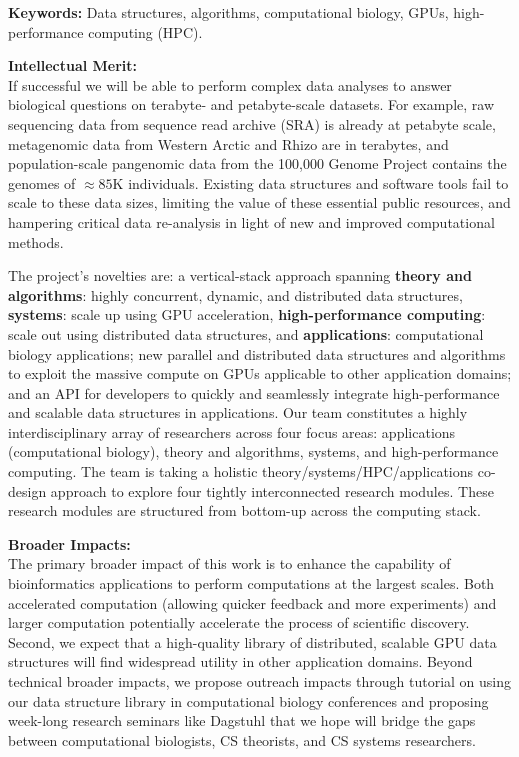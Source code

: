 {\noindent \textbf{\large Keywords:} Data structures, algorithms, computational biology, GPUs, high-performance computing (HPC).

\noindent \textbf{\large Intellectual Merit:}\\
If successful we will be able to perform complex data analyses to answer biological questions on terabyte- and petabyte-scale datasets. For example, raw sequencing data from sequence read archive (SRA) is already at petabyte scale, metagenomic data from Western Arctic and Rhizo are in terabytes, and population-scale pangenomic data from the 100,000 Genome Project contains the genomes of $\approx85$K individuals. Existing data structures and software tools fail to scale to these data sizes, limiting the value of these essential public resources, and hampering critical data re-analysis in light of new and improved computational methods.

The project’s novelties are: a vertical-stack approach spanning \textbf{theory and algorithms}: highly concurrent, dynamic, and distributed data structures, \textbf{systems}: scale up using GPU acceleration, \textbf{high-performance computing}: scale out using distributed data structures, and \textbf{applications}: computational biology applications; new parallel and distributed data structures and algorithms to exploit the massive compute on GPUs applicable to other application domains; and an API for developers to quickly and seamlessly integrate high-performance and scalable data structures in applications.
%
Our team constitutes a highly interdisciplinary array of researchers across four focus areas: applications (computational biology), theory and algorithms, systems, and high-performance computing. The team is taking a holistic theory/systems/HPC/applications co-design approach to explore four tightly interconnected research modules. These research modules are structured from bottom-up across the computing stack.

\noindent \textbf{\large Broader Impacts: }\\
The primary broader impact of this work is to enhance the capability of bioinformatics applications to perform computations at the largest scales. Both accelerated computation (allowing quicker feedback and more experiments) and larger computation potentially accelerate the process of scientific discovery. Second, we expect that a high-quality library of distributed, scalable GPU data structures will find widespread utility in other application domains.
%
Beyond technical broader impacts, we propose outreach impacts through tutorial on using our data structure library in computational biology conferences and proposing week-long research seminars like Dagstuhl that we hope will bridge the gaps between computational biologists, CS theorists, and CS systems researchers.
}